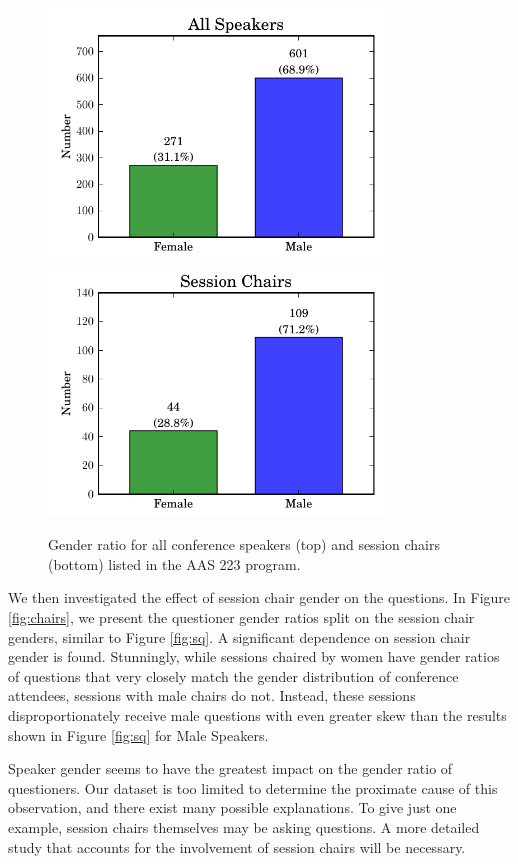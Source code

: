 \documentclass[iop]{emulateapj}
\begin{document}
\begin{figure}[!t]
\centering
\includegraphics[width=3.5in]{speakers}
\includegraphics[width=3.5in]{chairs}
\caption{Gender ratio for all conference speakers (top) and session chairs (bottom) listed in the AAS 223 program.}
\label{fig:speakerchair}
\end{figure}



We then investigated the effect of session chair gender on the questions. In Figure \ref{fig:chairs}, we present the questioner gender ratios split on the session chair genders, similar to Figure \ref{fig:sq}. A significant dependence on session chair gender is found. Stunningly, while sessions chaired by women  have gender ratios of questions that very closely match the gender distribution of conference attendees, sessions with male chairs do not. Instead, these sessions disproportionately receive male questions with even greater skew than the results shown in Figure \ref{fig:sq} for Male Speakers. 

Speaker gender seems to have the greatest impact on the gender ratio of questioners. Our dataset is too limited to determine the proximate cause of this observation, and there exist many possible explanations. To give just one example, session chairs themselves may be asking questions. A more detailed study that accounts for the involvement of session chairs will be necessary.
\end{document}
